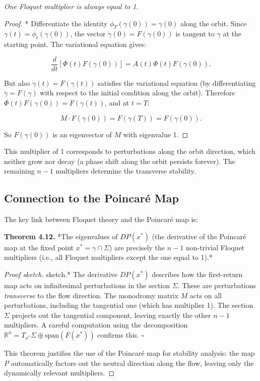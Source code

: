 \begin{proposition}\label{prop:4.11.}
\textit{One Floquet multiplier is always equal to 1.}
\end{proposition}


\begin{proof}
* Differentiate the identity $\phi_T(\gamma(0)) = \gamma(0)$ along the orbit. Since $\gamma(t) = \phi_t(\gamma(0))$, the vector $\dot{\gamma}(0) = F(\gamma(0))$ is tangent to $\gamma$ at the starting point. The variational equation gives:

\[
\frac{d}{dt}\left[\Phi(t) F(\gamma(0))\right] = A(t) \Phi(t) F(\gamma(0)).
\]

But also $\dot{\gamma}(t) = F(\gamma(t))$ satisfies the variational equation (by differentiating $\dot{\gamma} = F(\gamma)$ with respect to the initial condition along the orbit). Therefore $\Phi(t) F(\gamma(0)) = F(\gamma(t))$, and at $t = T$:

\[
M \cdot F(\gamma(0)) = F(\gamma(T)) = F(\gamma(0)).
\]

So $F(\gamma(0))$ is an eigenvector of $M$ with eigenvalue 1.
\end{proof}


This multiplier of 1 corresponds to perturbations along the orbit direction, which neither grow nor decay (a phase shift along the orbit persists forever). The remaining $n - 1$ multipliers determine the transverse stability.

\subsection{Connection to the Poincaré Map}\label{sec:4.7.4}

The key link between Floquet theory and the Poincaré map is:

\textbf{Theorem 4.12.} *The eigenvalues of $DP(x^*)$ (the derivative of the Poincaré map at the fixed point $x^* = \gamma \cap \Sigma$) are precisely the $n-1$ non-trivial Floquet multipliers (i.e., all Floquet multipliers except the one equal to 1).*

\begin{proof}[Proof sketch]
sketch.* The derivative $DP(x^*)$ describes how the first-return map acts on infinitesimal perturbations in the section $\Sigma$. These are perturbations \textit{transverse} to the flow direction. The monodromy matrix $M$ acts on all perturbations, including the tangential one (which has multiplier 1). The section $\Sigma$ projects out the tangential component, leaving exactly the other $n-1$ multipliers. A careful computation using the decomposition $\mathbb{R}^n = T_{x^*}\Sigma \oplus \text{span}(F(x^*))$ confirms this. $\square$

This theorem justifies the use of the Poincaré map for stability analysis: the map $P$ automatically factors out the neutral direction along the flow, leaving only the dynamically relevant multipliers.

\end{proof}

